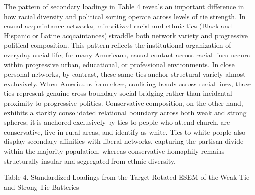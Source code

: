 \documentclass[
  12pt
]{article}
\begin{document}
The pattern of secondary loadings in Table 4 reveals an important difference in how racial diversity and political sorting operate across levels of tie strength. In casual acquaintance networks, minoritized racial and ethnic ties (Black and Hispanic or Latine acquaintances) straddle both network variety and progressive political composition. This pattern reflects the institutional organization of everyday social life; for many Americans, casual contact across racial lines occurs within progressive urban, educational, or professional environments. In close personal networks, by contrast, these same ties anchor structural variety almost exclusively. When Americans form close, confiding bonds across racial lines, those ties represent genuine cross-boundary social bridging rather than incidental proximity to progressive politics. Conservative composition, on the other hand, exhibits a starkly consolidated relational boundary across both weak and strong spheres; it is anchored exclusively by ties to people who attend church, are conservative, live in rural areas, and identify as white. Ties to white people also display secondary affinities with liberal networks, capturing the partisan divide within the majority population, whereas conservative homophily remains structurally insular and segregated from ethnic diversity.


Table 4. Standardized Loadings from the Target-Rotated ESEM of the Weak-Tie and Strong-Tie Batteries
\end{document}
